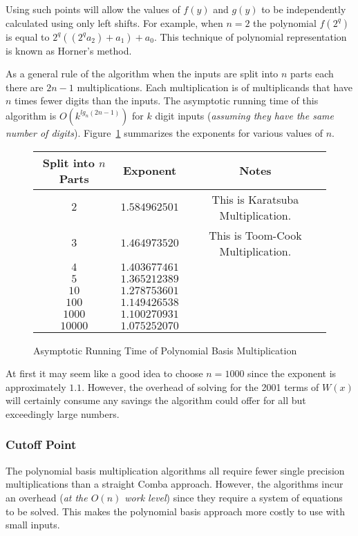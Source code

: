 \documentclass[b5paper]{book}
\begin{document}
Using such points will allow the values of $f(y)$ and $g(y)$ to be independently calculated using only left shifts.  For example, when $n = 2$ the
polynomial $f(2^q)$ is equal to $2^q((2^qa_2) + a_1) + a_0$.  This technique of polynomial representation is known as Horner's method.  

As a general rule of the algorithm when the inputs are split into $n$ parts each there are $2n - 1$ multiplications.  Each multiplication is of 
multiplicands that have $n$ times fewer digits than the inputs.  The asymptotic running time of this algorithm is 
$O \left ( k^{lg_n(2n - 1)} \right )$ for $k$ digit inputs (\textit{assuming they have the same number of digits}).  Figure~\ref{fig:exponent}
summarizes the exponents for various values of $n$.

\begin{figure}
\begin{center}
\begin{tabular}{|c|c|c|}
\hline \textbf{Split into $n$ Parts} & \textbf{Exponent}  & \textbf{Notes}\\
\hline $2$ & $1.584962501$ & This is Karatsuba Multiplication. \\
\hline $3$ & $1.464973520$ & This is Toom-Cook Multiplication. \\
\hline $4$ & $1.403677461$ &\\
\hline $5$ & $1.365212389$ &\\
\hline $10$ & $1.278753601$ &\\
\hline $100$ & $1.149426538$ &\\
\hline $1000$ & $1.100270931$ &\\
\hline $10000$ & $1.075252070$ &\\
\hline
\end{tabular}
\end{center}
\caption{Asymptotic Running Time of Polynomial Basis Multiplication}
\label{fig:exponent}
\end{figure}

At first it may seem like a good idea to choose $n = 1000$ since the exponent is approximately $1.1$.  However, the overhead
of solving for the 2001 terms of $W(x)$ will certainly consume any savings the algorithm could offer for all but exceedingly large
numbers.  

\subsubsection{Cutoff Point}
The polynomial basis multiplication algorithms all require fewer single precision multiplications than a straight Comba approach.  However, 
the algorithms incur an overhead (\textit{at the $O(n)$ work level}) since they require a system of equations to be solved.  This makes the
polynomial basis approach more costly to use with small inputs.
\end{document}
